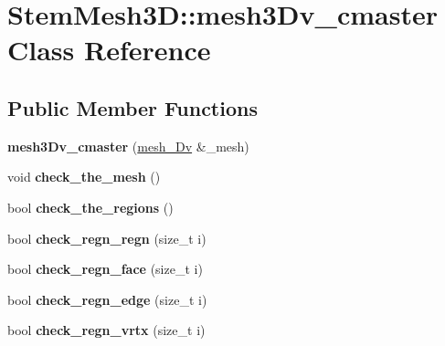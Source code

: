 \hypertarget{classStemMesh3D_1_1mesh3Dv__cmaster}{}\section{Stem\+Mesh3D\+:\+:mesh3\+Dv\+\_\+cmaster Class Reference}
\label{classStemMesh3D_1_1mesh3Dv__cmaster}
\subsection*{Public Member Functions}
\begin{DoxyCompactItemize}
\item 
\mbox{\label{classStemMesh3D_1_1mesh3Dv__cmaster_a5f173d546a048c0b8e5ab97dedcae2f3}} 
{\bfseries mesh3\+Dv\+\_\+cmaster} (\hyperlink{classStemMesh3D_1_1mesh__3Dv}{mesh\+\_\+Dv} \&\+\_\+mesh)
\item 
\mbox{\label{classStemMesh3D_1_1mesh3Dv__cmaster_adebe008c2a1a5cb80796598a607e3a17}} 
void {\bfseries check\+\_\+the\+\_\+mesh} ()
\item 
\mbox{\label{classStemMesh3D_1_1mesh3Dv__cmaster_a152f66d7e9d03b559bcd6a7f8814e8f9}} 
bool {\bfseries check\+\_\+the\+\_\+regions} ()
\item 
\mbox{\label{classStemMesh3D_1_1mesh3Dv__cmaster_a61a6d5816db89690e551bcb182662ece}} 
bool {\bfseries check\+\_\+regn\+\_\+regn} (size\+\_\+t i)
\item 
\mbox{\label{classStemMesh3D_1_1mesh3Dv__cmaster_a1b0d14413e110f44c1949448a525ba99}} 
bool {\bfseries check\+\_\+regn\+\_\+face} (size\+\_\+t i)
\item 
\mbox{\label{classStemMesh3D_1_1mesh3Dv__cmaster_a0f64ae92708cac17ce2182191be54df9}} 
bool {\bfseries check\+\_\+regn\+\_\+edge} (size\+\_\+t i)
\item 
\mbox{\label{classStemMesh3D_1_1mesh3Dv__cmaster_a17ae764e6d0ecc435226f4ad5faa6334}} 
bool {\bfseries check\+\_\+regn\+\_\+vrtx} (size\+\_\+t i)

\end{DoxyCompactItemize}

